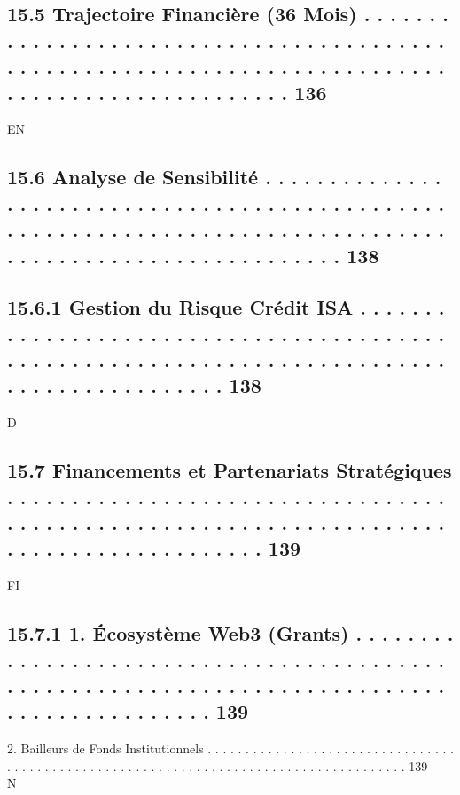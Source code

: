 \documentclass[12pt,landscape,a4paper]{article}
\begin{document}
\subsection{15.5    Trajectoire Financière (36 Mois) . . . . . . . . . . . . . . . . . . . . . . . . . . . . . . . . . . . . . . . . . . . . . . . . . . . . . . . . . . . . . . . . . . . . . . . . . . . . . . . . . . . . . . . . . . . . . . . . . 136}
\vspace{0.5em}
\vspace{0.5em}
\vspace{0.5em}
\vspace{0.5em}
EN\\
\subsection{15.6    Analyse de Sensibilité . . . . . . . . . . . . . . . . . . . . . . . . . . . . . . . . . . . . . . . . . . . . . . . . . . . . . . . . . . . . . . . . . . . . . . . . . . . . . . . . . . . . . . . . . . . . . . . . . . . . . . . . . . . . 138}
\subsection{15.6.1              Gestion du Risque Crédit ISA . . . . . . . . . . . . . . . . . . . . . . . . . . . . . . . . . . . . . . . . . . . . . . . . . . . . . . . . . . . . . . . . . . . . . . . . . . . . . . . . . . . . . . . . . . . . 138}
\vspace{0.5em}
\vspace{0.5em}
\vspace{0.5em}
\vspace{0.5em}
D\\
\subsection{15.7    Financements et Partenariats Stratégiques . . . . . . . . . . . . . . . . . . . . . . . . . . . . . . . . . . . . . . . . . . . . . . . . . . . . . . . . . . . . . . . . . . . . . . . . . . . . . . . . . . . . . . . . 139}
\vspace{0.5em}
\vspace{0.5em}
\vspace{0.5em}
\vspace{0.5em}
FI\\
\subsection{15.7.1             1. Écosystème Web3 (Grants) . . . . . . . . . . . . . . . . . . . . . . . . . . . . . . . . . . . . . . . . . . . . . . . . . . . . . . . . . . . . . . . . . . . . . . . . . . . . . . . . . . . . . . . . . . . . 139}
2. Bailleurs de Fonds Institutionnels . . . . . . . . . . . . . . . . . . . . . . . . . . . . . . . . . . . . . . . . . . . . . . . . . . . . . . . . . . . . . . . . . . . . . . . . . . . . . . . . . . . . . . 139\\
N\\
\end{document}
